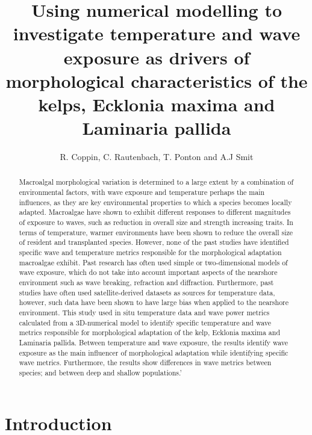 \documentclass[
  a4paper,
]{article}
\title{Using numerical modelling to investigate temperature and wave exposure
as drivers of morphological characteristics of the kelps, Ecklonia
maxima and Laminaria pallida}
\author{R. Coppin, C. Rautenbach, T. Ponton and A.J Smit}
\date{}
\begin{document}
\maketitle
\begin{abstract}
Macroalgal morphological variation is determined to a large extent by a
combination of environmental factors, with wave exposure and temperature
perhaps the main influences, as they are key environmental properties to
which a species becomes locally adapted. Macroalgae have shown to
exhibit different responses to different magnitudes of exposure to
waves, such as reduction in overall size and strength increasing traits.
In terms of temperature, warmer environments have been shown to reduce
the overall size of resident and transplanted species. However, none of
the past studies have identified specific wave and temperature metrics
responsible for the morphological adaptation macroalgae exhibit. Past
research has often used simple or two-dimensional models of wave
exposure, which do not take into account important aspects of the
nearshore environment such as wave breaking, refraction and diffraction.
Furthermore, past studies have often used satellite-derived datasets as
sources for temperature data, however, such data have been shown to have
large bias when applied to the nearshore environment. This study used in
situ temperature data and wave power metrics calculated from a
3D-numerical model to identify specific temperature and wave metrics
responsible for morphological adaptation of the kelp, Ecklonia maxima
and Laminaria pallida. Between temperature and wave exposure, the
results identify wave exposure as the main influencer of morphological
adaptation while identifying specific wave metrics. Furthermore, the
results show differences in wave metrics between species; and between
deep and shallow populations.'
\end{abstract}

\hypertarget{introduction}{%
\section{Introduction}\label{introduction}}
\end{document}
